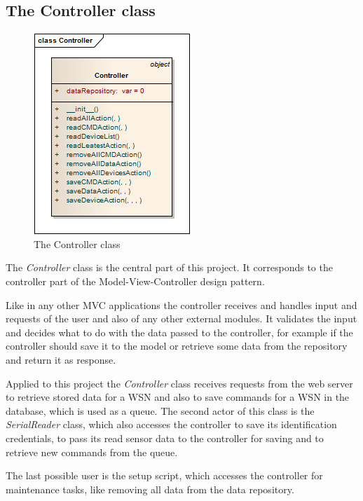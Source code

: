 \subsection{The Controller class}
\begin{figure}[H]
   \centering
   \includegraphics[scale=1]{pic/Controller.png}%
   \caption{The Controller class}
   \label{Controllerpic}%
\end{figure}

The \textit{Controller} class is the central part of this project. It corresponds to the controller part of the Model-View-Controller design pattern.

Like in any other MVC applications the controller receives and handles input and requests of the user and also of any other external modules. 
It validates the input and decides what to do with the data passed to the controller, 
for example if the controller should save it to the model or retrieve some data from the repository and return it as response.

Applied to this project the \textit{Controller} class receives requests from the web server to retrieve stored data for a 
WSN and also to save commands for a WSN in the database, which is used as a queue. The second actor of this class is the 
\textit{SerialReader} class, which also accesses the controller to save its identification credentials, 
to pass its read sensor data to the controller for saving and to retrieve new commands from the queue.

The last possible user is the setup script, which accesses the controller for maintenance tasks, like removing all data from the data repository.



\newpage
